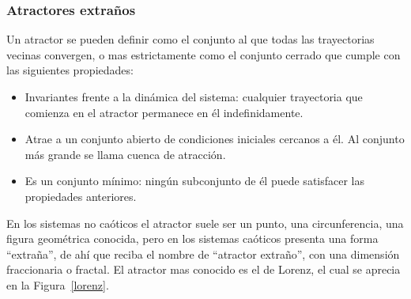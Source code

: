 \documentclass[letterpaper, 11pt, oneside]{article}
\theoremstyle{definition}
\theoremstyle{remark}
\begin{document}
\begin{itemize}
\newpage

\subsubsection{Atractores extraños} \cite{caos_atractores}
Un atractor se pueden definir como el conjunto al que todas las trayectorias vecinas convergen, o mas estrictamente como el conjunto cerrado que cumple con las siguientes propiedades:

\begin{itemize}
	\item Invariantes frente a la dinámica del sistema: cualquier trayectoria que comienza en el atractor permanece en él indefinidamente.
	\item Atrae a un conjunto abierto de condiciones iniciales cercanos a él. Al conjunto más grande se llama cuenca de atracción.
	\item Es un conjunto mínimo: ningún subconjunto de él puede satisfacer las propiedades anteriores.
\end{itemize}

En los sistemas no caóticos el atractor suele ser un punto, una circunferencia, una figura geométrica conocida, pero en los sistemas caóticos presenta una forma “extraña”, de ahí que reciba el nombre de “atractor extraño”, con una dimensión fraccionaria o fractal.\cite{bellateoria} El atractor mas conocido es el de Lorenz, el cual se aprecia en la Figura~\ref{lorenz}.


\end{itemize}
\end{document}
